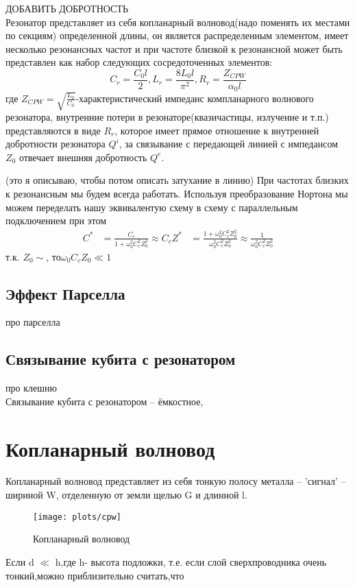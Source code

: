 \documentclass[12pt, twoside]{report}
\begin{document}
ДОБАВИТЬ ДОБРОТНОСТЬ\\
Резонатор представляет из себя копланарный волновод(надо поменять их местами по секциям) определенной длины, он является распределенным элементом, имеет несколько резонансных частот и при частоте близкой к резонансной может быть представлен как набор следующих сосредоточенных элементов:
	\begin{equation}
	C_r=\frac{C_0 l}{2},
	L_r=\frac{8L_0 l}{\pi^2},
	R_r=\frac{Z_{CPW}}{\alpha_0 l}
	\end{equation}
где $Z_{CPW}=\sqrt{\frac{L_0}{C_0}}$-характеристический импеданс компланарного волнового резонатора, внутренние потери в резонаторе(квазичастицы, излучение и т.п.) представляются в виде $R_r$, которое имеет прямое отношение к внутренней добротности резонатора $Q^i$, за связывание с передающей линией с импедансом $Z_0$ отвечает внешняя добротность $Q^e$.

(это я описываю, чтобы потом описать затухание в линию)
 При частотах близких к резонансным мы будем всегда работать. Используя преобразование Нортона\cite{Goppl2008} мы можем переделать нашу эквивалентую схему в схему с параллельным подключением
при этом  
	\begin{align}
	C^*&=\frac{C_c}{1+\omega_0^2 C_c^2 Z_0^2} \approx C_c
	Z^*&=\frac{1+\omega_0^2 C_c^2 Z_0^2}{\omega_0^2 C_c^2 Z_0^2} \approx \frac{1}{\omega_0^2 C_c^2 Z_0^2} 
	\end{align}
т.к. $Z_0\sim$, то$\omega_0 C_c Z_0 \ll 1$
	\subsection{Эффект Парселла}
про парселла\cite{Koch2007}	
	\subsection{Связывание кубита с резонатором}
про клешню\cite{Sank2014}\\
Связывание кубита с резонатором -- ёмкостное,	

\newpage
	\section{Копланарный волновод}%
Копланарный волновод представляет из себя тонкую полосу металла -- 'сигнал' -- шириной W, отделенную от земли щелью G и длинной l.
	\begin{figure}[h]
		\begin{center}
\texttt{[image: plots/cpw]}
\caption{Копланарный волновод}
		\end{center}
	\end{figure}
Если d $\ll$ h,где h- высота подложки, т.е. если слой сверхпроводника очень тонкий,можно приблизительно считать,что\cite{Goppl2008}
	
\end{document}
